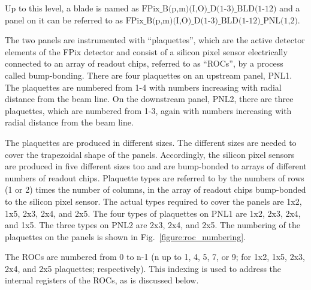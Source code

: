 \documentclass{cmspaper}
\begin{document}
Up to this level, a blade is named as
$\mbox{FPix\_B(p,m)(I,O)\_D(1-3)\_BLD(1-12)}$
and a panel  on it can be referred to
as
$\mbox{FPix\_B(p,m)(I,O)\_D(1-3)\_BLD(1-12)\_PNL(1,2).}$

The two panels are instrumented with ``plaquettes'',
which are the active detector elements of the FPix detector and consist of
a silicon pixel sensor electrically connected to an array of readout chips, 
referred to as ``ROCs'', by a process called bump-bonding.
There are four plaquettes on an upstream panel, PNL1.
The plaquettes are numbered from 1-4 with numbers increasing with radial distance from the beam line. 
On the downstream  panel, PNL2, there are three plaquettes,
which are numbered from 1-3, again with numbers increasing with radial distance from the beam line.

The plaquettes are produced in different sizes.
The different sizes are needed to cover the trapezoidal 
shape of the panels. 
Accordingly, the silicon pixel sensors are produced in five different sizes too
and are bump-bonded to arrays of different numbers of readout chips.
Plaquette types are referred to by the numbers of rows (1 or 2) times the number of columns,
in the array of readout chips bump-bonded to the silicon pixel sensor.
The actual types required to cover the  panels are 
1x2, 1x5, 2x3, 2x4, and 2x5. The four types of plaquettes on PNL1 are  1x2,
2x3, 2x4, and 1x5. The three types on PNL2 are 2x3, 2x4, and 2x5.
The numbering of the plaquettes on the panels is shown in 
Fig.~\ref{figure:roc_numbering}.



The  ROCs are numbered from 0 to n-1 
(n up to 1, 4, 5, 7, or 9; for 1x2, 1x5, 2x3, 2x4, and 2x5 plaquettes; respectively). 
This indexing is used to address the internal registers of the ROCs,
as is discussed below.
\end{document}
